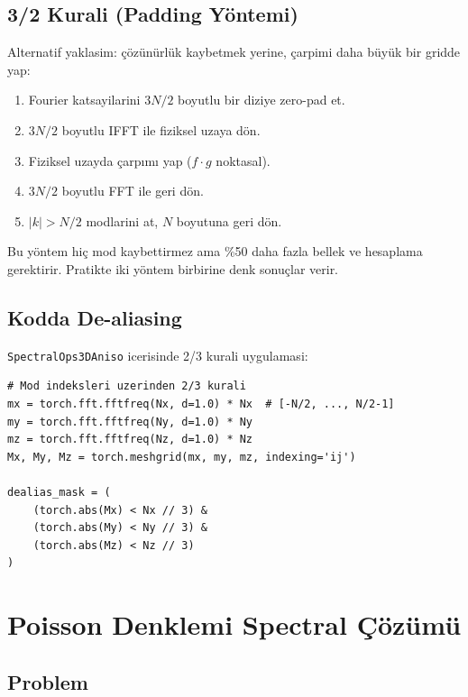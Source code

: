 \subsection{3/2 Kurali (Padding Yöntemi)}

Alternatif yaklasim: çözünürlük kaybetmek yerine, çarpimi daha büyük bir gridde yap:

\begin{enumerate}
\item Fourier katsayilarini $3N/2$ boyutlu bir diziye zero-pad et.
\item $3N/2$ boyutlu IFFT ile fiziksel uzaya dön.
\item Fiziksel uzayda çarpımı yap ($f\cdot g$ noktasal).
\item $3N/2$ boyutlu FFT ile geri dön.
\item $|k| > N/2$ modlarini at, $N$ boyutuna geri dön.
\end{enumerate}

Bu yöntem hiç mod kaybettirmez ama \%50 daha fazla bellek ve hesaplama gerektirir. Pratikte iki yöntem birbirine denk sonuçlar verir.

\subsection{Kodda De-aliasing}

\texttt{SpectralOps3DAniso} icerisinde 2/3 kurali uygulamasi:
\begin{lstlisting}[caption={De-aliasing mask olusturma},label={lst:dealias}]
# Mod indeksleri uzerinden 2/3 kurali
mx = torch.fft.fftfreq(Nx, d=1.0) * Nx  # [-N/2, ..., N/2-1]
my = torch.fft.fftfreq(Ny, d=1.0) * Ny
mz = torch.fft.fftfreq(Nz, d=1.0) * Nz
Mx, My, Mz = torch.meshgrid(mx, my, mz, indexing='ij')

dealias_mask = (
    (torch.abs(Mx) < Nx // 3) &
    (torch.abs(My) < Ny // 3) &
    (torch.abs(Mz) < Nz // 3)
)
\end{lstlisting}


\section{Poisson Denklemi Spectral Çözümü}
\label{sec:poisson}

\subsection{Problem}

